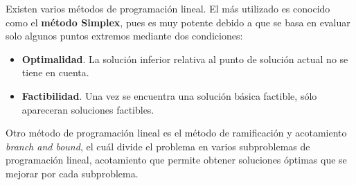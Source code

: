 Existen varios métodos de programación lineal. El más utilizado es conocido como el \textbf{método Simplex}, pues es muy potente debido a que se basa en evaluar solo algunos puntos extremos mediante dos condiciones:
\begin{itemize}
\item \textbf{Optimalidad}. La solución inferior relativa al punto de solución actual no se tiene en cuenta.
  \item \textbf{Factibilidad}. Una vez se encuentra una solución básica factible, sólo apareceran soluciones factibles.
\end{itemize}
Otro método de programación lineal es el método de ramificación y acotamiento \textit{branch and bound}, el cuál divide el problema en varios subproblemas de programación lineal, acotamiento que permite obtener soluciones óptimas que se mejorar por cada subproblema.\\
